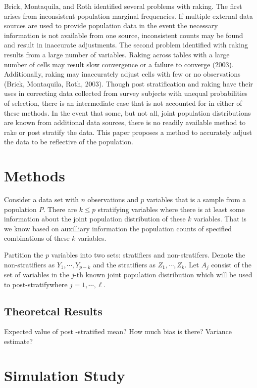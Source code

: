 \documentclass[aoas]{imsart}\usepackage[]{graphicx}\usepackage[]{color}
\begin{document}
Brick, Montaquila, and Roth identified several problems with raking. The first arises from inconsistent population marginal frequencies. If multiple external data sources are used to provide population data in the event the necessary information is not available from one source, inconsistent counts may be found and result in inaccurate adjustments. The second problem identified with raking results from a large number of variables. Raking across tables with a large number of cells may result slow convergence or a failure to converge (2003). Additionally, raking may inaccurately adjust cells with few or no observations (Brick, Montaquila, Roth, 2003).  
Though post stratification and raking have their uses in correcting data collected from survey subjects with unequal probabilities of selection, there is an intermediate case that is not accounted for in either of these methods. In the event that some, but not all, joint population distributions are known from additional data sources, there is no readily available method to rake or post stratify the data. This paper proposes a method to accurately adjust the data to be reflective of the population. 



\section{Methods}
Consider a data set with $n$ observations and $p$ variables that is a sample from a population $P$.  There are $k\le p$ stratifying variables where there is at least some information about the joint population distribution of these $k$ variables.  That is we know based on auxilliary information the population counts of specified combinations of these $k$ variables.  

Partition the $p$ variables into two sets: stratifiers and non-stratifers.  Denote the non-stratifiers as $Y_{1}, \cdots, Y_{p-k}$ and the stratifiers as $Z_{1}, \cdots, Z_{k}$.  Let $A_{j}$ consist of the set of variables in the $j$-th known joint population distribution which will be used to post-stratifywhere $j= 1, \cdots, \ell$.  

\subsection{Theoretcal Results}
Expected value of post -stratified mean?  How much bias is there?  
Variance estimate?  

\section{Simulation Study}
\end{document}
